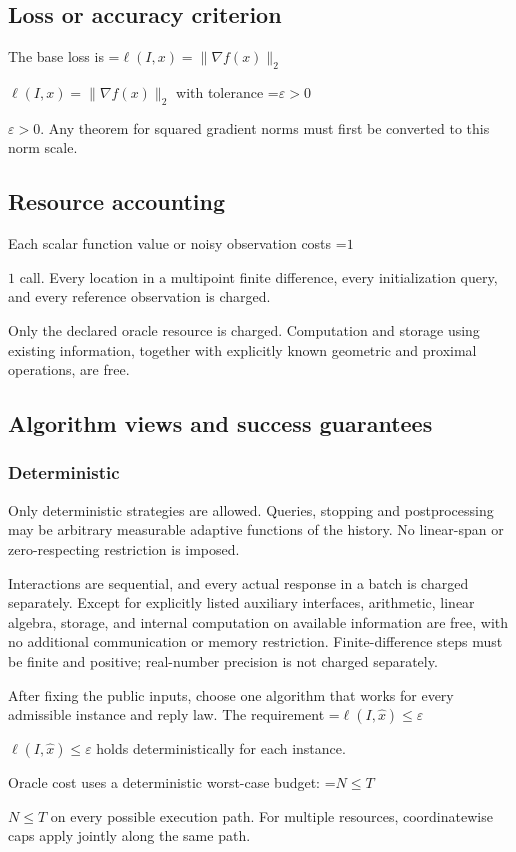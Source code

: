 \documentclass[10pt,a4paper]{article}
\newcommand{\AtlasMath}[1]{\par\begingroup\centering\setbox0=\hbox{$\displaystyle #1$}\ifdim\wd0>1.4\linewidth\typeout{ATLAS WIDE FORMULA: \the\wd0}\fi\ifdim\wd0>\linewidth\resizebox{\linewidth}{!}{\box0}\else\box0\fi\par\endgroup}
\newcommand{\AtlasInlineMath}[1]{\begingroup\setbox0=\hbox{$#1$}\ifdim\wd0>.4\linewidth\endgroup\AtlasMath{#1}\else\endgroup$#1$\fi}
\begin{document}
\subsection{Loss or accuracy criterion}
The base loss is \AtlasInlineMath{\ell(I,x)=\|\nabla f(x)\|_2} with tolerance \AtlasInlineMath{\varepsilon>0}. Any theorem for squared gradient norms must first be converted to this norm scale.

\subsection{Resource accounting}
Each scalar function value or noisy observation costs \AtlasInlineMath{1} call. Every location in a multipoint finite difference, every initialization query, and every reference observation is charged.

Only the declared oracle resource is charged. Computation and storage using existing information, together with explicitly known geometric and proximal operations, are free.

\subsection{Algorithm views and success guarantees}
\subsubsection{Deterministic}
Only deterministic strategies are allowed. Queries, stopping and postprocessing may be arbitrary measurable adaptive functions of the history. No linear-span or zero-respecting restriction is imposed.

Interactions are sequential, and every actual response in a batch is charged separately. Except for explicitly listed auxiliary interfaces, arithmetic, linear algebra, storage, and internal computation on available information are free, with no additional communication or memory restriction. Finite-difference steps must be finite and positive; real-number precision is not charged separately.

After fixing the public inputs, choose one algorithm that works for every admissible instance and reply law. The requirement \AtlasInlineMath{\ell(I,\widehat{x})\le \varepsilon} holds deterministically for each instance.

Oracle cost uses a deterministic worst-case budget: \AtlasInlineMath{N\le T} on every possible execution path. For multiple resources, coordinatewise caps apply jointly along the same path.
\end{document}
